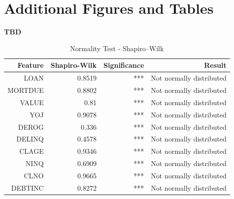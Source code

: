 \chapter{Additional Figures and Tables}
\label{chap:app1}

\textbf{TBD}

\begin{table}[H]
    \small
    \setlength{\tabcolsep}{8pt}
    \renewcommand{\arraystretch}{1.3}
    \centering
        \caption[Normality Test - Shapiro--Wilk]{Normality Test - Shapiro--Wilk}\label{tab:normalitytest}
        \begin{tabular}{rrrr}
    \toprule
    \textbf{Feature} & \textbf{Shapiro-Wilk} & \textbf{Significance} & \textbf{Result}\\
    \midrule
    \hline
    LOAN & 0.8519 & *** & Not normally distributed \\ 
    MORTDUE & 0.8802 & *** & Not normally distributed \\ 
    VALUE & 0.81 & *** & Not normally distributed \\ 
    YOJ & 0.9078 & *** & Not normally distributed \\ 
    DEROG & 0.336 & *** & Not normally distributed \\ 
    DELINQ & 0.4578 & *** & Not normally distributed \\ 
    CLAGE & 0.9346 & *** & Not normally distributed \\ 
    NINQ & 0.6909 & *** & Not normally distributed \\ 
    CLNO & 0.9665 & *** & Not normally distributed \\ 
    DEBTINC & 0.8272 & *** & Not normally distributed \\
    \hline
    \bottomrule
    \end{tabular}
    \vspace{0.35em}

        \vspace{-1em}
\end{table}


